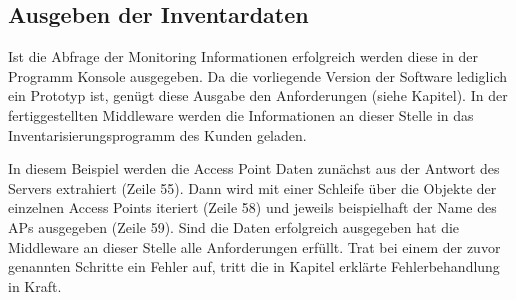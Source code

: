 \subsection{Ausgeben der Inventardaten}\label{subsection:ausgeben-der-Inventardaten}

Ist die Abfrage der Monitoring Informationen erfolgreich werden diese in der Programm Konsole ausgegeben. Da die vorliegende Version der Software lediglich ein Prototyp ist, genügt diese Ausgabe den Anforderungen (siehe Kapitel). In der fertiggestellten Middleware werden die Informationen an dieser Stelle in das Inventarisierungsprogramm des Kunden geladen. 

In diesem Beispiel werden die Access Point Daten zunächst aus der Antwort des Servers extrahiert (Zeile 55). Dann wird mit einer Schleife über die Objekte der einzelnen Access Points iteriert (Zeile 58) und jeweils beispielhaft der Name des APs ausgegeben (Zeile 59).
Sind die Daten erfolgreich ausgegeben hat die Middleware an dieser Stelle alle Anforderungen erfüllt. Trat bei einem der zuvor genannten Schritte ein Fehler auf, tritt die in Kapitel erklärte Fehlerbehandlung in Kraft.



